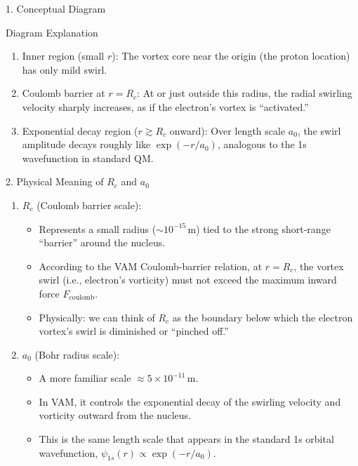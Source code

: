 1. Conceptual Diagram

Diagram Explanation

\begin{enumerate}
    \item Inner region (small \(r\)): The vortex core near the origin (the proton location) has only mild swirl.
    \item Coulomb barrier at \(r = R_c\): At or just outside this radius, the radial swirling velocity sharply increases, as if the electron’s vortex is “activated.”
    \item Exponential decay region (\(r \gtrsim R_c\) onward): Over length scale \(a_0\), the swirl amplitude decays roughly like \(\exp(-r/a_0)\), analogous to the 1s wavefunction in standard QM.
\end{enumerate}

2. Physical Meaning of \(R_c\) and \(a_0\)

\begin{enumerate}
\item \(R_c\) (Coulomb barrier scale):

    \begin{itemize}
    \item Represents a small radius (\(\sim 10^{-15}\,\mathrm{m}\)) tied to the strong short‐range “barrier” around the nucleus.
    \item According to the VAM Coulomb‐barrier relation, at \(r = R_c\), the vortex swirl (i.e., electron’s vorticity) must not exceed the maximum inward force \(F_{\mathrm{coulomb}}\).
    \item Physically: we can think of \(R_c\) as the boundary below which the electron vortex’s swirl is diminished or “pinched off.”
    \end{itemize}

\item \(a_0\) (Bohr radius scale):

    \begin{itemize}
    \item A more familiar scale \(\approx 5 \times 10^{-11}\,\mathrm{m}\).
    \item In VAM, it controls the exponential decay of the swirling velocity and vorticity outward from the nucleus.
    \item This is the same length scale that appears in the standard 1s orbital wavefunction, \(\psi_{1s}(r) \propto \exp(-r/a_0)\).
    \end{itemize}
\end{enumerate}

